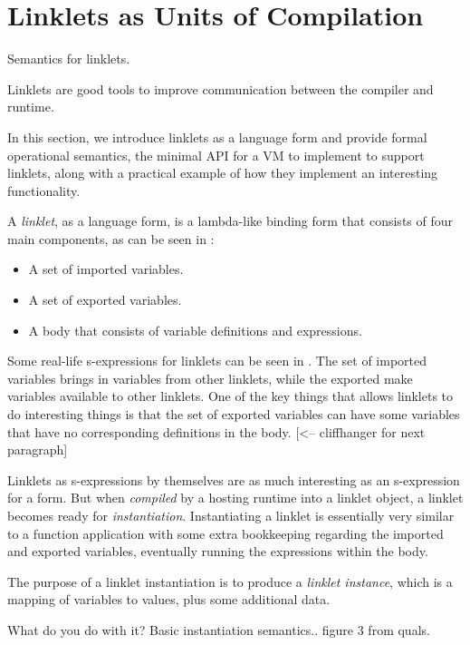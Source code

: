 	\section[\texorpdfstring{Linklets as Units of Compilation}{Semantics for Linklets}]{Linklets as Units of Compilation}
		\label{section:linklet-semantics}

		\begin{mainpoint}
			Semantics for linklets.

			Linklets are good tools to improve communication between the compiler and runtime.
		\end{mainpoint}

		\begin{paragraph-here}
			In this section, we introduce linklets as a language form and provide formal operational semantics, the minimal API for a VM to implement to support linklets, along with a practical example of how they implement an interesting functionality.
		\end{paragraph-here}


		\begin{paragraph-here}
			A \emph{linklet}, as a language form, is a lambda-like binding form that consists of four main components, as can be seen in :

			\begin{itemize}
				\item A set of imported variables.
				\item A set of exported variables.
				\item A body that consists of variable definitions and expressions.
			\end{itemize}

			Some real-life s-expressions for linklets can be seen in . The set of imported variables brings in variables from other linklets, while the exported make variables available to other linklets. One of the key things that allows linklets to do interesting things is that the set of exported variables can have some variables that have no corresponding definitions in the body. [<-- cliffhanger for next paragraph]
		\end{paragraph-here}

		\begin{paragraph-here}
			Linklets as s-expressions by themselves are as much interesting as an s-expression for a  form. But when \emph{compiled} by a hosting runtime into a linklet object, a linklet becomes ready for \emph{instantiation}. Instantiating a linklet is essentially very similar to a function application with some extra bookkeeping regarding the imported and exported variables, eventually running the expressions within the body.


			The purpose of a linklet instantiation is to produce a \emph{linklet instance}, which is a mapping of variables to values, plus some additional data.

			What do you do with it? Basic instantiation semantics.. figure 3 from quals.
		\end{paragraph-here}

